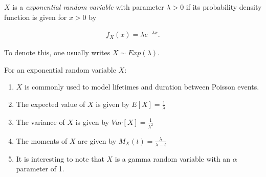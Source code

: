 \documentclass[12pt]{article}
\begin{document}
$X$ is a \emph{exponential random variable} with parameter $\lambda>0$ if its probability density function is given for $x>0$ by

\begin{align*}
f_X(x) = \lambda e^{-\lambda x}.
\end{align*}

To denote this, one usually writes $X\sim Exp(\lambda)$.


For an exponential random variable $X$:
\begin{enumerate}
\item $X$ is commonly used to model lifetimes and duration between Poisson events.
\item The expected value of $X$ is given by $E[X] = \frac{1}{\lambda}$
\item The variance of $X$ is given by $Var[X] = \frac{1}{\lambda^2}$
\item The moments of $X$ are given by $M_X(t) = \frac{\lambda}{\lambda - t}$
\item It is interesting to note that $X$ is a gamma random variable with an $\alpha$ parameter of 1.

\end{enumerate}
\end{document}
